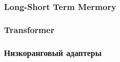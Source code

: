 

\subsubsection{Long-Short Term Mermory}



\subsubsection{Transformer}




\subsubsection{Низкоранговый адаптеры}



